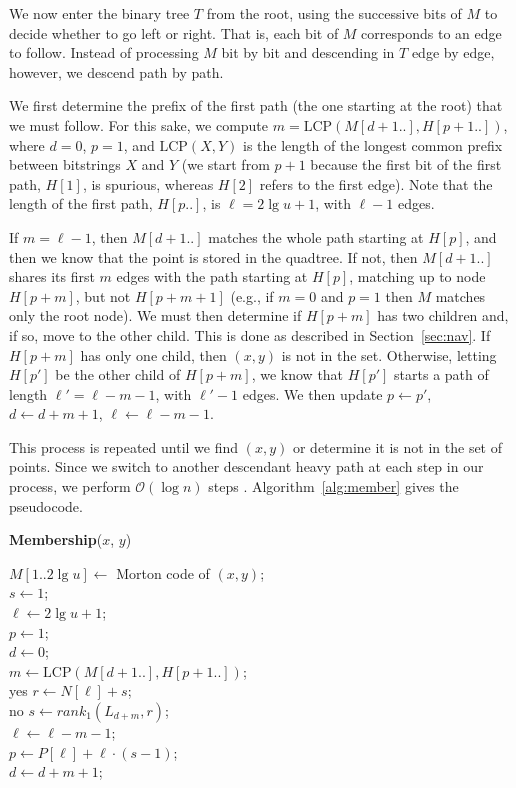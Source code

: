 \documentclass{elsarticle}
\newcommand{\Oh}[1]
  {\ensuremath{\mathcal{O}\!\left( {#1} \right)}}
\newcommand{\LCP}{\ensuremath{\mathrm{LCP}}}
\begin{document}
We now enter the binary tree $T$ from the root, using the successive bits of $M$ to
decide whether to go left or right. That is, each bit of $M$ corresponds to an edge to follow.
Instead of processing $M$ bit by bit and descending in $T$ edge by edge, however, we descend path by path. 

We first determine the prefix of the first path (the one starting at the root) that we must follow. For this sake, we compute $m = \LCP(M[d+1..],H[p+1..])$, where $d=0$, $p=1$, and $\LCP(X,Y)$ is the length of the longest common prefix between bitstrings $X$ and $Y$ (we start from $p+1$ because the first bit of the first path, $H[1]$, is spurious, whereas $H[2]$ refers to the first edge). Note that the length of the first path, $H[p..]$, is $\ell = 2\lg u+1$, with $\ell-1$ edges.

If $m=\ell-1$, then $M[d+1..]$ matches the whole path starting at $H[p]$, and then we know that the point is stored in the quadtree. If not, then $M[d+1..]$ shares its first $m$ edges with the path starting at $H[p]$, matching up to node $H[p+m]$, but not $H[p+m+1]$ (e.g., if $m=0$ and $p=1$ then $M$ matches only the root node). We must then determine if $H[p+m]$ has two children and, if so, move to the other child. This is done as described in Section~\ref{sec:nav}.
If $H[p+m]$ has only one child, then $(x,y)$ is not in the set. Otherwise, letting $H[p']$ be the other child of $H[p+m]$, we know that $H[p']$ starts a path of length $\ell'=\ell-m-1$, with $\ell'-1$ edges. We then update $p \gets p'$, $d \leftarrow d+m+1$, $\ell \leftarrow \ell-m-1$.

This process is repeated until we find $(x,y)$ or determine it is not in the set of points. Since we switch to another descendant heavy path at each step in our process, we perform $\Oh{\log n}$ steps \cite{ST83}. Algorithm~\ref{alg:member} gives
the pseudocode.

\begin{algorithm}[t]
\caption{{\bf Membership}($x$, $y$)}
\label{alg:member}

$M[1..2\lg u] \gets$ Morton code of $(x,y)$; \\
$s \gets 1$; \\
$\ell \gets 2\lg u+1$; \\
$p \gets 1$; \\
$d \gets 0$; \\
   { $m \gets \textrm{LCP}(M[d+1..],H[p+1..])$; \\
      {\Return yes}
     $r \gets N[\ell]+s$; \\
      {\Return no}
     $s \gets rank_1(L_{d+m},r)$; \\
     $\ell \gets \ell-m-1$; \\
     $p \gets P[\ell]+\ell \cdot (s-1)$; \\
     $d \gets d+m+1$;
   }
\end{algorithm}
\end{document}
